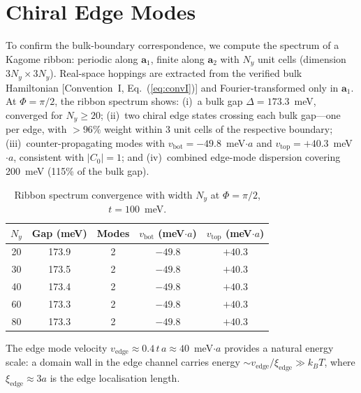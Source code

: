 \documentclass[aps,prb,twocolumn,superscriptaddress,floatfix]{revtex4-2}
\begin{document}
\section{Chiral Edge Modes}
\label{sec:edge}

To confirm the bulk-boundary correspondence, we compute the spectrum of a Kagome ribbon: periodic along $\mathbf{a}_1$, finite along $\mathbf{a}_2$ with $N_y$ unit cells (dimension $3N_y \times 3N_y$). Real-space hoppings are extracted from the verified bulk Hamiltonian [Convention~I, Eq.~(\ref{eq:convI})] and Fourier-transformed only in $\mathbf{a}_1$. At $\Phi = \pi/2$, the ribbon spectrum shows: (i)~a bulk gap $\Delta = 173.3$~meV, converged for $N_y \geq 20$; (ii)~two chiral edge states crossing each bulk gap---one per edge, with $> 96\%$ weight within 3 unit cells of the respective boundary; (iii)~counter-propagating modes with $v_{\mathrm{bot}} = -49.8$~meV$\cdot a$ and $v_{\mathrm{top}} = +40.3$~meV$\cdot a$, consistent with $|C_0| = 1$; and (iv)~combined edge-mode dispersion covering 200~meV (115\% of the bulk gap).

\begin{table}[b]
\caption{Ribbon spectrum convergence with width $N_y$ at $\Phi = \pi/2$, $t = 100$~meV.}
\label{tab:ribbon}
\begin{ruledtabular}
\begin{tabular}{ccccc}
$N_y$ & Gap (meV) & Modes & $v_{\mathrm{bot}}$ (meV$\cdot a$) & $v_{\mathrm{top}}$ (meV$\cdot a$) \\
\hline
20 & 173.9 & 2 & $-49.8$ & $+40.3$ \\
30 & 173.5 & 2 & $-49.8$ & $+40.3$ \\
40 & 173.4 & 2 & $-49.8$ & $+40.3$ \\
60 & 173.3 & 2 & $-49.8$ & $+40.3$ \\
80 & 173.3 & 2 & $-49.8$ & $+40.3$ \\
\end{tabular}
\end{ruledtabular}
\end{table}

The edge mode velocity $v_{\mathrm{edge}} \approx 0.4\,t\,a \approx 40$~meV$\cdot a$ provides a natural energy scale: a domain wall in the edge channel carries energy $\sim v_{\mathrm{edge}}/\xi_{\mathrm{edge}} \gg k_BT$, where $\xi_{\mathrm{edge}} \approx 3a$ is the edge localisation length.

\end{document}
